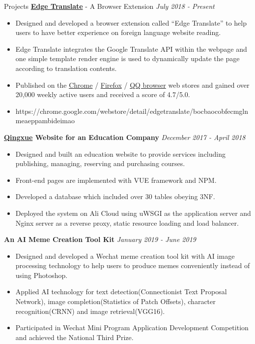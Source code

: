 \documentclass{resume} %
\begin{document}
\begin{rSection}{Projects}
{\bf  \href{https://github.com/EdgeTranslate/EdgeTranslate}{Edge Translate}}{ - A Browser Extension} \hfill {\em July 2018 - Present}
\begin{itemize}[itemsep=-0.3em]
    \item Designed and developed a browser extension called “Edge Translate” to help users to have better experience on foreign language website reading.
    \item Edge Translate integrates the Google Translate API within the webpage and one simple template render engine is used to dynamically update the page according to translation contents.
    \item Published on the \href{https://chrome.google.com/webstore/detail/edgetranslate/bocbaocobfecmglnmeaeppambideimao}{Chrome} / \href{https://addons.mozilla.org/zh-CN/firefox/addon/edge_translate/}{Firefox} / \href{https://appcenter.browser.qq.com/search/detail?key=edgetranslate&id=bocbaocobfecmglnmeaeppambideimao%20&title=edgetranslate}{QQ browser} web stores and gained over 20,000 weekly active users and received a score of 4.7/5.0.
    \item https://chrome.google.com/webstore/detail/edgetranslate/bocbaocobfecmglnmeaeppambideimao
\end{itemize}

{\bf \href{https://github.com/Mark-Fenng/QingXueFrontEnd}{Qingxue} Website for an Education Company} \hfill {\em December 2017 - April 2018}
\begin{itemize}[itemsep=-0.3em]
    \item Designed and built an education website to provide services including publishing, managing, reserving and purchasing courses.
    \item Front-end pages are implemented with VUE framework and NPM.
    \item Developed a database which included over 30 tables obeying 3NF.
    \item Deployed the system on Ali Cloud using uWSGI as the application server and Nginx server as a reverse proxy, static resource loading and load balancer.
\end{itemize}

{\bf An AI Meme Creation Tool Kit} \hfill {\em January 2019 - June 2019}
\begin{itemize}[itemsep=-0.3em]
    \item Designed and developed a Wechat meme creation tool kit with AI image processing technology to help users to produce memes conveniently instead of using Photoshop.
    \item Applied AI technology for text detection(Connectionist Text Proposal Network), image completion(Statistics of Patch Offsets), character recognition(CRNN) and image retrieval(VGG16).
    \item Participated in Wechat Mini Program Application Development Competition and achieved the National Third Prize.
\end{itemize}
    

\end{rSection}
\end{document}
